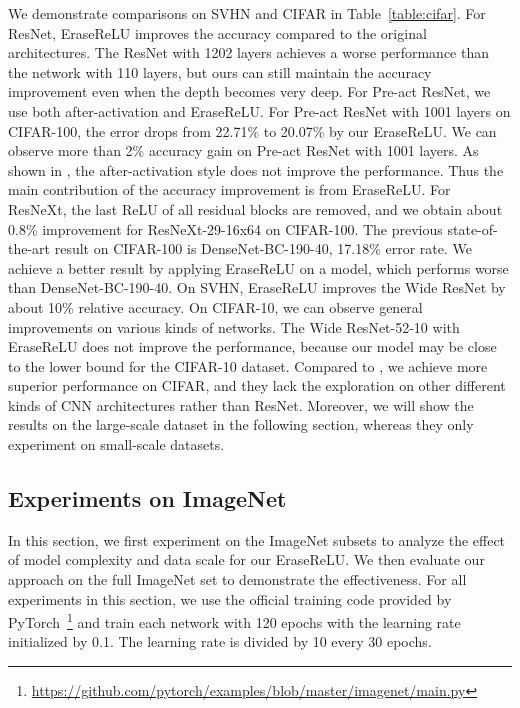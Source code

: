 \documentclass[10pt,twocolumn,letterpaper]{article}
\begin{document}
We demonstrate comparisons on SVHN and CIFAR in Table~\ref{table:cifar}.
For ResNet, EraseReLU improves the accuracy compared to the original architectures. The ResNet with 1202 layers achieves a worse performance than the network with 110 layers, but ours can still maintain the accuracy improvement even when the depth becomes very deep.
For Pre-act ResNet, we use both after-activation and EraseReLU. For Pre-act ResNet with 1001 layers on CIFAR-100, the error drops from 22.71\% to 20.07\% by our EraseReLU.
We can observe more than 2\% accuracy gain on Pre-act ResNet with 1001 layers.
As shown in \cite{he2016identity}, the after-activation style does not improve the performance. Thus the main contribution of the accuracy improvement is from EraseReLU.
For ResNeXt, the last ReLU of all residual blocks are removed, and we obtain about 0.8\% improvement for ResNeXt-29-16x64 on CIFAR-100.
The previous state-of-the-art result on CIFAR-100 is DenseNet-BC-190-40, 17.18\% error rate. We achieve a better result by applying EraseReLU on a model, which performs worse than DenseNet-BC-190-40.
On SVHN, EraseReLU improves the Wide ResNet by about 10\% relative accuracy. On CIFAR-10, we can observe general improvements on various kinds of networks. The Wide ResNet-52-10 with EraseReLU does not improve the performance, because our model may be close to the lower bound for the CIFAR-10 dataset.
Compared to \cite{zhao2017training}, we achieve more superior performance on CIFAR, and they lack the exploration on other different kinds of CNN architectures rather than ResNet.
Moreover, we will show the results on the large-scale dataset in the following section, whereas they only experiment on small-scale datasets.


\subsection{Experiments on ImageNet}

In this section, we first experiment on the ImageNet subsets to analyze the effect of model complexity and data scale for our EraseReLU.
We then evaluate our approach on the full ImageNet set to demonstrate the effectiveness.
For all experiments in this section, we use the official training code provided by PyTorch~\footnote{\url{https://github.com/pytorch/examples/blob/master/imagenet/main.py}} and train each network with 120 epochs with the learning rate initialized by 0.1. The learning rate is divided by 10 every 30 epochs.
\end{document}
